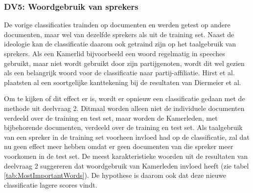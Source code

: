 \subsubsection{DV5: Woordgebruik van sprekers}
De vorige classificaties trainden op documenten en werden getest op andere documenten, maar wel van dezelfde sprekers als uit de training set. Naast de ideologie kan de classificatie daarom ook getraind zijn op het taalgebruik van sprekers. Als een Kamerlid bijvoorbeeld een woord regelmatig in speeches gebruikt, maar niet wordt gebruikt door zijn partijgenoten, wordt dit wel gezien als een belangrijk woord voor de classificatie naar partij-affiliatie. Hirst et al. \cite{Hirst_textto} plaatsten al een soortgelijke kanttekening bij de resultaten van Diermeier et al.\par
Om te kijken of dit effect er is, wordt er opnieuw een classificatie gedaan met de methode uit deelvraag 2. Ditmaal worden alleen niet de individuele documenten verdeeld over de training en test set, maar worden de Kamerleden, met bijbehorende documenten, verdeeld over de training en test set. Als taalgebruik van een spreker in de training set voorheen invloed had op de classificatie, zal dat nu geen effect meer hebben omdat er geen documenten van die spreker meer voorkomen in de test set. De meest karakteristieke woorden uit de resultaten van deelvraag 2 suggereren dat woordgebruik van Kamerleden invloed heeft (zie tabel \ref{tab:MostImportantWords}). De hypothese is daarom ook dat deze nieuwe classificatie lagere scores vindt.\par


